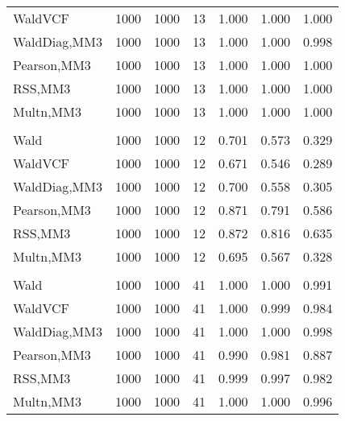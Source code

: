 \documentclass[
]{article}
\begin{document}
\begin{table}[H]
{\begin{tabular}[t]{lrrrrrr}
\hspace{1em}WaldVCF & 1000 & 1000 & 13 & 1.000 & 1.000 & 1.000\\
\hspace{1em}WaldDiag,MM3 & 1000 & 1000 & 13 & 1.000 & 1.000 & 0.998\\
\hspace{1em}Pearson,MM3 & 1000 & 1000 & 13 & 1.000 & 1.000 & 1.000\\
\hspace{1em}RSS,MM3 & 1000 & 1000 & 13 & 1.000 & 1.000 & 1.000\\
\hspace{1em}Multn,MM3 & 1000 & 1000 & 13 & 1.000 & 1.000 & 1.000\\
\addlinespace[0.3em]
\multicolumn{7}{l}{\textbf{2F 10V}}\\
\hspace{1em}Wald & 1000 & 1000 & 12 & 0.701 & 0.573 & 0.329\\
\hspace{1em}WaldVCF & 1000 & 1000 & 12 & 0.671 & 0.546 & 0.289\\
\hspace{1em}WaldDiag,MM3 & 1000 & 1000 & 12 & 0.700 & 0.558 & 0.305\\
\hspace{1em}Pearson,MM3 & 1000 & 1000 & 12 & 0.871 & 0.791 & 0.586\\
\hspace{1em}RSS,MM3 & 1000 & 1000 & 12 & 0.872 & 0.816 & 0.635\\
\hspace{1em}Multn,MM3 & 1000 & 1000 & 12 & 0.695 & 0.567 & 0.328\\
\addlinespace[0.3em]
\multicolumn{7}{l}{\textbf{3F 15V}}\\
\hspace{1em}Wald & 1000 & 1000 & 41 & 1.000 & 1.000 & 0.991\\
\hspace{1em}WaldVCF & 1000 & 1000 & 41 & 1.000 & 0.999 & 0.984\\
\hspace{1em}WaldDiag,MM3 & 1000 & 1000 & 41 & 1.000 & 1.000 & 0.998\\
\hspace{1em}Pearson,MM3 & 1000 & 1000 & 41 & 0.990 & 0.981 & 0.887\\
\hspace{1em}RSS,MM3 & 1000 & 1000 & 41 & 0.999 & 0.997 & 0.982\\
\hspace{1em}Multn,MM3 & 1000 & 1000 & 41 & 1.000 & 1.000 & 0.996\\
\bottomrule
\end{tabular}}
\endgroup{}
\end{table}
\end{document}
